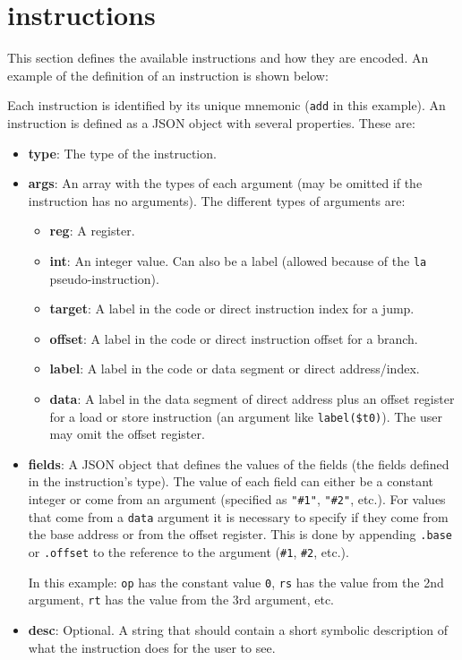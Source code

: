 \documentclass[11pt,a4paper,twoside,titlepage]{report}
\begin{document}
\section{instructions}

This section defines the available instructions and how they are encoded.
An example of the definition of an instruction is shown below:



Each instruction is identified by its unique mnemonic (\verb+add+ in this example).
An instruction is defined as a JSON object with several properties. These are:

\begin{itemize}
	\item \textbf{type}: The type of the instruction.
	\item \textbf{args}: An array with the types of each argument (may be omitted if
		the instruction has no arguments).
		The different types of arguments are:
		\begin{itemize}
			\item \textbf{reg}: A register.
			\item \textbf{int}: An integer value. Can also be a label (allowed because 
				of the \verb+la+ pseudo-instruction).
			\item \textbf{target}: A label in the code or direct instruction index for 
				a jump.
			\item \textbf{offset}: A label in the code or direct instruction offset 
				for a branch.
			\item \textbf{label}: A label in the code or data segment or direct 
				address/index.
			\item \textbf{data}: A label in the data segment of direct address plus
				an offset register for a load or store instruction (an argument like
				\verb+label($t0)+). The user may omit the offset register.
		\end{itemize}
	\item \textbf{fields}: A JSON object that defines the values of the fields
		(the fields defined in the instruction's type). The value of each field
		can either be a constant integer or come from an argument (specified as
		\verb+"#1"+, \verb+"#2"+, etc.).
		For values that come from a \verb+data+ argument it is necessary to
		specify if they come from the base address or from the offset register.
		This is done by appending \verb+.base+ or \verb+.offset+ to the reference
		to the argument (\verb+#1+, \verb+#2+, etc.).
		
		In this example: \verb+op+ has the constant value \verb+0+, \verb+rs+
		has the value from the 2nd argument, \verb+rt+ has the value from the 3rd
		argument, etc.
	\item \textbf{desc}: Optional. A string that should contain a short symbolic
		description of what the instruction does for the user to see.
\end{itemize}
\end{document}
